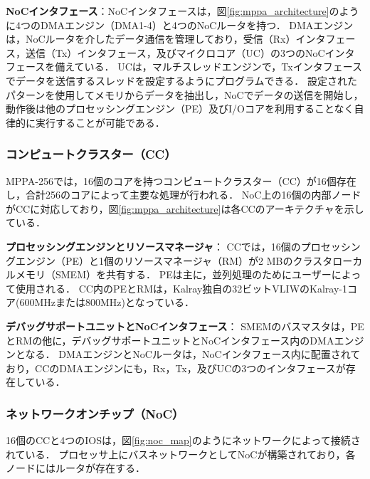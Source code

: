 \documentclass[submit,techrep]{ipsj_v2/UTF8/ipsj}
\begin{document}
\textbf{NoCインタフェース}：NoCインタフェースは，図\ref{fig:mppa_architecture}のように4つのDMAエンジン（DMA1-4）と4つのNoCルータを持つ．
DMAエンジンは，NoCルータを介したデータ通信を管理しており，受信（Rx）インタフェース，送信（Tx）インタフェース，及びマイクロコア（UC）の3つのNoCインタフェースを備えている．
UCは，マルチスレッドエンジンで，Txインタフェースでデータを送信するスレッドを設定するようにプログラムできる．
設定されたパターンを使用してメモリからデータを抽出し，NoCでデータの送信を開始し，動作後は他のプロセッシングエンジン（PE）及びI/Oコアを利用することなく自律的に実行することが可能である．

\subsubsection{コンピュートクラスター（CC）}
\label{sec:cc}
MPPA-256では，16個のコアを持つコンピュートクラスター（CC）が16個存在し，合計256のコアによって主要な処理が行われる．
NoC上の16個の内部ノードがCCに対応しており，図\ref{fig:mppa_architecture}は各CCのアーキテクチャを示している．

\textbf{プロセッシングエンジンとリソースマネージャ}：
CCでは，16個のプロセッシングエンジン（PE）と1個のリソースマネージャ（RM）が2 MBのクラスタローカルメモリ（SMEM）を共有する．
PEは主に，並列処理のためにユーザーによって使用される．
CC内のPEとRMは，Kalray独自の32ビットVLIWのKalray-1コア(600MHzまたは800MHz)となっている．

\textbf{デバッグサポートユニットとNoCインタフェース}：
SMEMのバスマスタは，PEとRMの他に，デバッグサポートユニットとNoCインタフェース内のDMAエンジンとなる．
DMAエンジンとNoCルータは，NoCインタフェース内に配置されており，CCのDMAエンジンにも，Rx，Tx，及びUCの3つのインタフェースが存在している．

\subsubsection{ネットワークオンチップ（NoC）}
\label{sec:noc}
16個のCCと4つのIOSは，図\ref{fig:noc_map}のようにネットワークによって接続されている．
プロセッサ上にバスネットワークとしてNoCが構築されており，各ノードにはルータが存在する．
\end{document}
